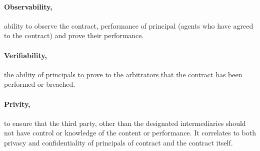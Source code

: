 \paragraph{Observability,}ability to observe the contract, performance of
principal (agents who have agreed to the contract) and prove their
performance.
\paragraph{Verifiability,}the ability of principals to prove to the arbitrators
that the contract has been performed or breached.  
\paragraph{Privity,}to ensure that the third party, other than the designated
intermediaries should not have control or knowledge of the content or
performance. It correlates to both privacy and confidentiality of principals of
contract and the contract itself. 
